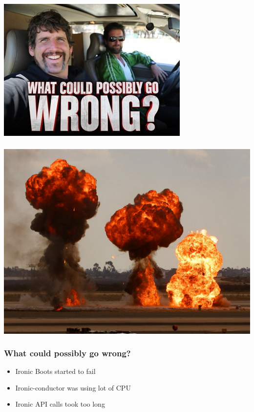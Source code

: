 \documentclass[aspectratio=169,11pt,hyperref={colorlinks=true}]{beamer}
\begin{document}
\begin{frame}
\frametitle{}
    \begin{center}
        \includegraphics[scale=0.75]{logos/wrong2.jpg}
    \end{center}
\end{frame}

\begin{frame}
\frametitle{}
    \begin{center}
        \includegraphics[scale=0.40]{logos/exp.jpg}
    \end{center}
\end{frame}



\begin{frame}
    \frametitle{What could possibly go wrong?}
    \begin{itemize}[<+-| alert@+>]
        \item Ironic Boots started to fail
        \item Ironic-conductor was using lot of CPU
        \item Ironic API calls took too long
    \end{itemize}
\end{frame}
\end{document}
